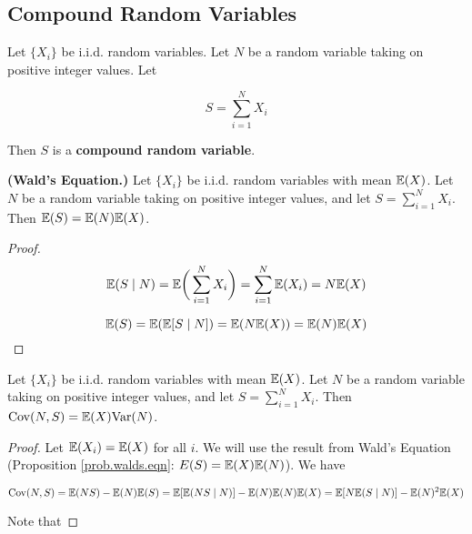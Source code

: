\begin{theorem}

\subsection{Compound Random Variables}

\begin{definition}Let \(\{X_i\}\) be i.i.d. random variables. Let \(N\) be a random variable taking on positive integer values. Let

\[
S = \sum_{i=1}^N X_i
\]

Then \(S\) is a \textbf{compound random variable}.

\end{definition}

\begin{proposition}\label{prob.walds.eqn} \textbf{(Wald's Equation.)} Let \(\{X_i\}\) be i.i.d. random variables with mean \(\mathbb{E}(X)\). Let \(N\) be a random variable taking on positive integer values, and let \(S = \sum_{i=1}^N X_i\). Then \(\mathbb{E}(S) = \mathbb{E}(N) \mathbb{E}(X)\).

\begin{proof}

\[
\mathbb{E}(S \mid N) = \mathbb{E} \bigg( \sum_{i=1}^N X_i \bigg) = \sum_{i=1}^N \mathbb{E}(X_i) = N \mathbb{E}(X) 
\]

\[
\mathbb{E}(S) = \mathbb{E}(\mathbb{E}[S \mid N]) = \mathbb{E}(N \mathbb{E}(X)) = \mathbb{E}(N) \mathbb{E}(X)
\]

\end{proof}

\end{proposition}

\begin{proposition} Let \(\{X_i\}\) be i.i.d. random variables with mean \(\mathbb{E}(X)\). Let \(N\) be a random variable taking on positive integer values, and let \(S = \sum_{i=1}^N X_i\). Then \(\mathrm{Cov}(N, S) = \mathbb{E}(X) \mathrm{Var}(N)\).

\end{proposition}

\begin{proof} Let \(\mathbb{E}(X_i) = \mathbb{E}(X)\) for all \(i\). We will use the result from Wald's Equation (Proposition \ref{prob.walds.eqn}: \(E(S) = \mathbb{E}(X) \mathbb{E}(N)\)). We have

\begin{equation} \label{prob.pm.ch3.98.1}
\mathrm{Cov}(N, S) = \mathbb{E}(NS) - \mathbb{E}(N) \mathbb{E}(S) = \mathbb{E}[ \mathbb{E}(NS \mid N)] - \mathbb{E}(N) \mathbb{E}(N) \mathbb{E}(X)= \mathbb{E}[ N\mathbb{E}(S \mid N)] - \mathbb{E}(N)^2 \mathbb{E}(X)
\end{equation}

Note that 


\end{proof}
\end{theorem}
